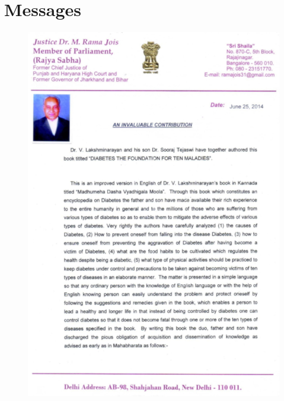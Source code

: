 \thispagestyle{empty}

\part*{Messages}


\begin{figure}[h]
\centering
\includegraphics[scale=2.1]{images/002.jpg}
\end{figure}



